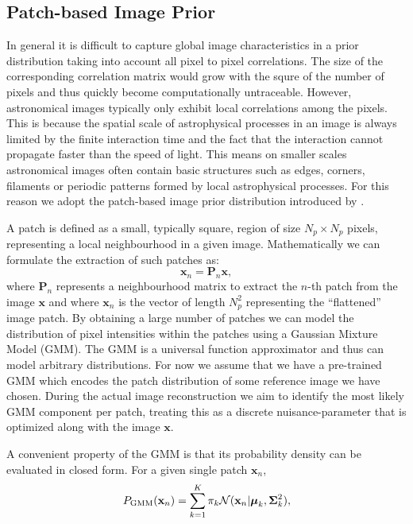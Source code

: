 \documentclass[twocolumn, lineno]{aastex631}
\begin{document}
    \subsection{Patch-based Image Prior}
    \label{sec:patch-prior}
    In general it is difficult to capture global image characteristics in a prior distribution taking into account all pixel to pixel correlations. The size of the corresponding correlation matrix would grow with the squre of the number of pixels  and thus quickly become computationally untraceable. However, astronomical images typically only exhibit local correlations among the pixels. This is because the spatial scale of astrophysical processes in an image is always limited by the finite interaction time and the fact that the interaction cannot propagate faster than the speed of light. This means on smaller scales astronomical images often contain basic structures such as edges, corners, filaments or periodic patterns formed by local astrophysical processes. For this reason we adopt the patch-based image prior distribution introduced by \cite{Zoran2011}. 

    A patch is defined as a small, typically square, region of size $N_p \times N_p$ pixels, representing a local neighbourhood in a given image. Mathematically we can formulate the extraction of such patches as:
    \begin{equation}
        \mathbf{x}_n = \mathbf{P}_n \mathbf{x},
    \end{equation}
    where $\mathbf{P}_n$ represents a neighbourhood matrix to extract the $n$-th patch from the image $\mathbf{x}$ and where $\mathbf{x}_n$ is the vector of length $N_p^2$ representing the \enquote{flattened} image patch. By obtaining a large number of patches we can model the distribution of pixel intensities within the patches using a Gaussian Mixture Model (GMM). The GMM is a universal function approximator and thus can model arbitrary distributions. For now we assume that we have a pre-trained GMM which encodes the patch distribution of some reference image we have chosen. During the actual image reconstruction we aim to identify the most likely GMM component per patch, treating this as a discrete nuisance-parameter that is optimized along with the image $\mathbf{x}$. 
    
    A convenient property of the GMM is that its probability density can be evaluated in closed form. For a given single patch $\mathbf{x}_n$,
    \begin{equation}
        \label{eq:gmm}
        P_{\rm GMM}(\mathbf{x}_n) = \sum_{k=1}^K \pi_k \mathcal{N}(\mathbf{x}_n| \boldsymbol{\mu}_k, \boldsymbol{\Sigma}_k^2),
    \end{equation}
\end{document}
